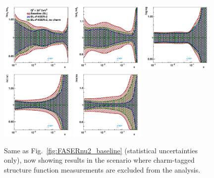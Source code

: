 \begin{figure}[t]
\centering
\includegraphics[width=0.32\textwidth]{plots/proton_fasernu2/inclusive-only_vs_inclusive+charm/statOnly_FASERv2_q2_10000_pdf_uv_ratio.pdf}
\includegraphics[width=0.32\textwidth]{plots/proton_fasernu2/inclusive-only_vs_inclusive+charm/statOnly_FASERv2_q2_10000_pdf_dv_ratio.pdf}
\includegraphics[width=0.32\textwidth]{plots/proton_fasernu2/inclusive-only_vs_inclusive+charm/statOnly_FASERv2_q2_10000_pdf_g_ratio.pdf}\\
\includegraphics[width=0.32\textwidth]{plots/proton_fasernu2/inclusive-only_vs_inclusive+charm/statOnly_FASERv2_q2_10000_pdf_Sea_ratio.pdf}
\includegraphics[width=0.32\textwidth]{plots/proton_fasernu2/inclusive-only_vs_inclusive+charm/statOnly_FASERv2_q2_10000_pdf_s_ratio.pdf}
\caption{Same as Fig.~\ref{fig:FASERnu2_baseline} (statistical uncertainties only),
  now showing results in the scenario where charm-tagged structure function measurements
  are excluded from the analysis.
}
\label{fig:FASERnu2_nocharm}
\end{figure}
